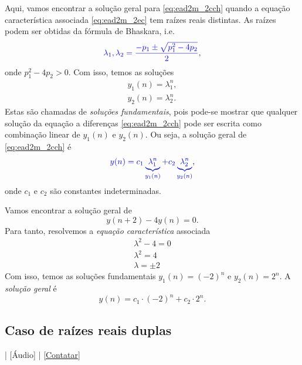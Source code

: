 Aqui, vamos encontrar a solução geral para \eqref{eq:ead2m_2cch} quando a equação característica associada \eqref{eq:ead2m_2ec} tem raízes reais distintas. As raízes podem ser obtidas da fórmula de Bhaskara, i.e.
\begin{equation}
  {\color{blue}\lambda_1,\lambda_2 = \frac{-p_1 \pm \sqrt{p_1^2-4p_2}}{2}},
\end{equation}
onde $p_1^2 - 4p_2 > 0$. Com isso, temos as soluções
\begin{gather}
  y_1(n) = \lambda_1^n,\\
  y_2(n) = \lambda_2^n.
\end{gather}
Estas são chamadas de \emph{soluções fundamentais}, pois pode-se mostrar que qualquer solução da equação a diferenças \eqref{eq:ead2m_2cch} pode ser escrita como combinação linear de $y_1(n)$ e $y_2(n)$. Ou seja, a solução geral de \eqref{eq:ead2m_2cch} é
\begin{equation}
  {\color{blue}y(n) = c_1\underbrace{\,\lambda_1^n\,}_{y_1(n)} + c_2\underbrace{\,\lambda_2^n\,}_{y_2(n)}},
\end{equation}
onde $c_1$ e $c_2$ são constantes indeterminadas.

\begin{ex}
  Vamos encontrar a solução geral de
  \begin{equation}
    y(n+2) - 4y(n) = 0.
  \end{equation}
  Para tanto, resolvemos a \emph{equação característica} associada
  \begin{gather}
    \lambda^2 - 4 = 0\\
    \lambda^2 = 4\\
    \lambda = \pm 2
  \end{gather}
  Com isso, temos as soluções fundamentais $y_1(n)=(-2)^n$ e $y_2(n)=2^n$. A \emph{solução geral} é
  \begin{equation}
    y(n) = c_1\cdot (-2)^n + c_2\cdot 2^n.
  \end{equation}
\end{ex}

\subsection{Caso de raízes reais duplas}

\begin{flushright}
  [Vídeo] | [Áudio] | \href{https://phkonzen.github.io/notas/contato.html}{[Contatar]}
\end{flushright}


